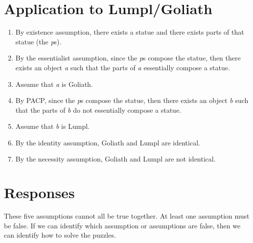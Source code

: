 \documentclass[9pt]{article}
\begin{document}
\section {Application to Lumpl/Goliath} 
\begin{enumerate}
\item By existence assumption, there exists a statue and there exists parts of that  statue (the \emph{p}s). 
\item By the essentialist assumption, since the \emph{p}s compose the statue, then there  exists an object \emph{a} such that the parts of \emph{a} essentially compose a statue. 
\item Assume that \emph{a} is Goliath. 
\item By PACP, since the \emph{p}s compose the statue, then there exists an object \emph{b}  such that the parts of \emph{b} do not essentially compose a statue. 
\item Assume that \emph{b} is Lumpl. 
\item By the identity assumption, Goliath and Lumpl are identical. 
\item By the necessity assumption, Goliath and Lumpl are not identical. 
\end{enumerate}


\section{Responses} 
These five assumptions cannot all be true together. At least one assumption must be  false. If we can identify which assumption or assumptions are false, then we can  identify how to solve the puzzles. 
\end{document}
